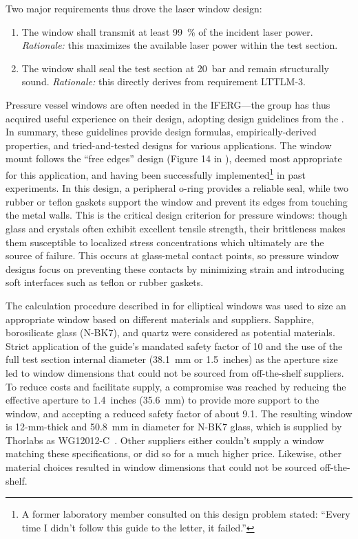            Two major requirements thus drove the laser window design:
            \begin{enumerate}
                \item The window shall transmit at least 99~\% of the incident laser power. \emph{Rationale:} this maximizes the available laser power within the test section.
                \item The window shall seal the test section at 20~bar and remain structurally sound. \emph{Rationale:} this directly derives from requirement LTTLM-3.
            \end{enumerate}

            Pressure vessel windows are often needed in the IFERG---the group has thus acquired useful experience on their design, adopting design guidelines from the \textcite{brookhavennationallaboratoryGuideGlassPlastic2005}. In summary, these guidelines provide design formulas, empirically-derived properties, and tried-and-tested designs for various applications. The window mount follows the ``free edges'' design (Figure 14 in \cite{brookhavennationallaboratoryGuideGlassPlastic2005}), deemed most appropriate for this application, and having been successfully implemented\footnote{A former laboratory member consulted on this design problem stated: ``Every time I didn't follow this guide to the letter, it failed.''} in past experiments. In this design, a peripheral o-ring provides a reliable seal, while two rubber or teflon gaskets support the window and prevent its edges from touching the metal walls. This is the critical design criterion for pressure windows: though glass and crystals often exhibit excellent tensile strength, their brittleness makes them susceptible to localized stress concentrations which ultimately are the source of failure. This occurs at glass-metal contact points, so pressure window designs focus on preventing these contacts by minimizing strain and introducing soft interfaces such as teflon or rubber gaskets.

            The calculation procedure described in \cite{brookhavennationallaboratoryGuideGlassPlastic2005} for elliptical windows was used to size an appropriate window based on different materials and suppliers. Sapphire, borosilicate glass (N-BK7), and quartz were considered as potential materials. Strict application of the guide's mandated safety factor of 10 and the use of the full test section internal diameter (\qty{38.1}{mm} or 1.5~inches) as the aperture size led to window dimensions that could not be sourced from off-the-shelf suppliers. To reduce costs and facilitate supply, a compromise was reached by reducing the effective aperture to 1.4~inches (\qty{35.6}{mm}) to provide more support to the window, and accepting a reduced safety factor of about 9.1. The resulting window is 12-mm-thick and \qty{50.8}{mm} in diameter for N-BK7 glass, which is supplied by Thorlabs as WG12012-C~\cite{thorlabsWG12012CO2NBK7}. Other suppliers either couldn't supply a window matching these specifications, or did so for a much higher price. Likewise, other material choices resulted in window dimensions that could not be sourced off-the-shelf.

